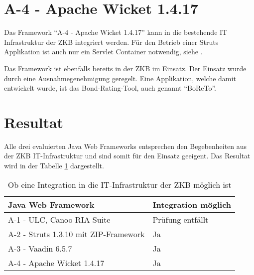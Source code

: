 \section{A-4 - Apache Wicket 1.4.17}

Das Framework ``A-4 - Apache Wicket 1.4.17'' kann in die bestehende IT
Infrastruktur der \ac{ZKB} integriert werden. Für den Betrieb einer Struts
Applikation ist auch nur ein Servlet Container notwendig, siehe
\cite{WicketDokumentation}.

Das Framework ist ebenfalls bereits in der \ac{ZKB} im Einsatz. Der Einsatz
wurde durch eine Ausnahmegenehmigung geregelt. Eine Applikation, welche damit
entwickelt wurde, ist das Bond-Rating-Tool, auch genannt ``BoReTo''.

\section{Resultat}

Alle drei evaluierten Java Web Frameworks entsprechen den Begebenheiten aus der
\ac{ZKB} IT-Infrastruktur und sind somit für den Einsatz geeigent. Das Resultat
wird in der Tabelle \ref{tab:integrationMoeglich} dargestellt.
\newline

\begin{table}[!h]
  \sffamily 
  \begin{center}
    \begin{tabular}{ll}
      \toprule
      \textbf{Java Web Framework} & \textbf{Integration möglich}\\
      \midrule
      A-1 - ULC, Canoo RIA Suite & Prüfung entfällt\\
      A-2 - Struts 1.3.10 mit ZIP-Framework & Ja\\
      A-3 - Vaadin 6.5.7 & Ja\\
      A-4 - Apache Wicket 1.4.17 & Ja\\
      \bottomrule
    \end{tabular}
    \caption{Ob eine Integration in die IT-Infrastruktur der \ac{ZKB} möglich
    ist}
    \label{tab:integrationMoeglich}
  \end{center}
\end{table}